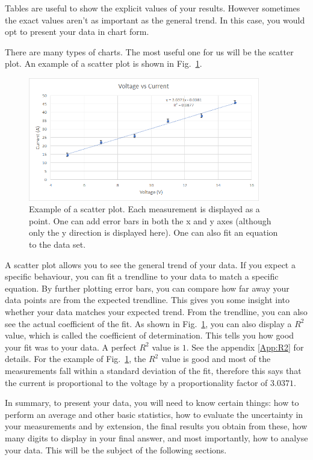 \documentclass[12pt]{report}
\begin{document}
Tables are useful to show the explicit values of your results. However sometimes the exact values aren't as important as the general trend. In this case, you would opt to present your data in chart form.

There are many types of charts. The most useful one for us will be the scatter plot. An example of a scatter plot is shown in Fig.~\ref{Fig:Example-Scatter}.
\begin{figure}[h]
\centering
\includegraphics[width=0.9\textwidth]{intro-example-scatter}
\caption{Example of a scatter plot. Each measurement is displayed as a point. One can add error bars in both the x and y axes (although only the y direction is displayed here). One can also fit an equation to the data set.}
\label{Fig:Example-Scatter}
\end{figure}

A scatter plot allows you to see the general trend of your data. If you expect a specific behaviour, you can fit a trendline to your data to match a specific equation. By further plotting error bars, you can compare how far away your data points are from the expected trendline. 
This gives you some insight into whether your data matches your expected trend. From the trendline, you can also see the actual coefficient of the fit. As shown in Fig.~\ref{Fig:Example-Scatter}, you can also display a $R^2$ value, which is called the coefficient of determination. This tells you how good your fit was to your data. A perfect $R^2$ value is $1$. See the appendix \ref{App:R2} for details.
For the example of Fig.~\ref{Fig:Example-Scatter}, the $R^2$ value is good and most of the measurements fall within a standard deviation of the fit, therefore this says that the current is proportional to the voltage by a proportionality factor of $3.0371$. 

In summary, to present your data, you will need to know certain things: how to perform an average and other basic statistics, how to evaluate the uncertainty in your measurements and by extension, the final results you obtain from these, how many digits to display in your final answer, and most importantly, how to analyse your data. This will be the subject of the following sections.
\end{document}
